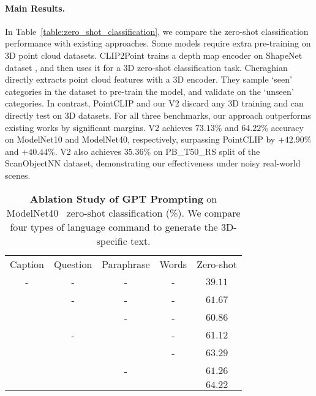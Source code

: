 \documentclass[10pt,twocolumn,letterpaper]{article}
\begin{document}
\paragraph{Main Results.} In Table~\ref{table:zero_shot_classification}, we compare the zero-shot classification performance with existing approaches.
Some models require extra pre-training on 3D point cloud datasets. CLIP2Point trains a depth map encoder on ShapeNet dataset \cite{chang2015shapenet}, and then uses it for a 3D zero-shot classification task. Cheraghian \etal \cite{cheraghian2022zero} directly extracts point cloud features with a 3D encoder. They sample `seen' categories in the dataset to pre-train the model, and validate on the `unseen' categories. In contrast, PointCLIP and our V2 discard any 3D training and can directly test on 3D datasets.
For all three benchmarks, our approach outperforms existing works by significant margins. V2 achieves $73.13\%$ and $64.22\%$ accuracy on ModelNet10 and ModelNet40, respectively, surpassing PointCLIP by $+42.90\%$ and $+40.44\%$. V2 also achieves $35.36\%$ on PB\_T50\_RS split of the ScanObjectNN dataset, demonstrating our effectiveness under noisy real-world scenes.

\begin{table}[t!]
\centering
\begin{adjustbox}{width=0.91\linewidth}
	\begin{tabular}{ccccc}
	\toprule
		Caption & Question & Paraphrase & Words & Zero-shot \\ \cmidrule(lr){1-5}
		- & - & - & - & $39.11$\\
		\checkmark & - & - & - & $61.67$\\
		\checkmark & \checkmark & - & - & $60.86$\\
		\checkmark & - & \checkmark & - & $61.12$\\
		\checkmark & \checkmark & \checkmark & - & $63.29$\\
		\checkmark & \checkmark & - & \checkmark & $61.26$\\ 
		\checkmark & \checkmark & \checkmark & \checkmark & $64.22$ \\ 
	\bottomrule
	\end{tabular}
\end{adjustbox}
\vspace{0.2cm}
\caption{\textbf{Ablation Study of GPT Prompting} on ModelNet40~\cite{wu20153d} zero-shot classification (\%). We compare four types of language command to generate the 3D-specific text.}
\vspace*{-5pt}
\label{table:ablation_commands}
\end{table}
\end{document}
